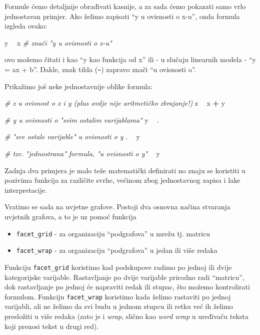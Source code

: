 \documentclass[]{book}
\newenvironment{Shaded}{\begin{snugshade}}{\end{snugshade}}
\newcommand{\StringTok}[1]{\textcolor[rgb]{0.31,0.60,0.02}{#1}}
\newcommand{\CommentTok}[1]{\textcolor[rgb]{0.56,0.35,0.01}{\textit{#1}}}
\newcommand{\OperatorTok}[1]{\textcolor[rgb]{0.81,0.36,0.00}{\textbf{#1}}}
\newcommand{\NormalTok}[1]{#1}
\providecommand{\tightlist}{%
  \setlength{\itemsep}{0pt}\setlength{\parskip}{0pt}}
\theoremstyle{definition}
\theoremstyle{definition}
\theoremstyle{definition}
\theoremstyle{remark}
\begin{document}
Formule ćemo detaljnije obrađivati kasnije, a za sada ćemo pokazati samo
vrlo jednostavan primjer. Ako želimo zapisati ``y u ovisnosti o x-u'',
onda formula izgleda ovako:

\begin{Shaded}
\begin{Highlighting}[]
\NormalTok{y }\OperatorTok{~}\StringTok{ }\NormalTok{x          }\CommentTok{# znači "y u ovisnosti o x-u"}
\end{Highlighting}
\end{Shaded}

ovo možemo čitati i kao ``y kao funkcija od x'' ili - u slučaju
linearnih modela - ``y = ax + b''. Dakle, znak tilda
(\texttt{\textasciitilde{}}) zapravo znači ``u ovisnosti o''.

Prikažimo još neke jednostavnije oblike formula:

\begin{Shaded}
\begin{Highlighting}[]
\CommentTok{# z u ovisnost o x i y (plus ovdje nije aritmetičko zbrajanje!)}
\NormalTok{z }\OperatorTok{~}\StringTok{ }\NormalTok{x }\OperatorTok{+}\StringTok{ }\NormalTok{y  }

\CommentTok{# y u ovisnosti o "svim ostalim varijablama"}
\NormalTok{y }\OperatorTok{~}\StringTok{ }\NormalTok{. }

\CommentTok{# "sve ostale varijable" u ovisnosti o y}
\NormalTok{. }\OperatorTok{~}\StringTok{ }\NormalTok{y   }

\CommentTok{# tzv. "jednostrana" formula, "u ovisnosti o y"}
\OperatorTok{~}\StringTok{ }\NormalTok{y        }
\end{Highlighting}
\end{Shaded}

Zadnja dva primjera je malo teže matematički definirati no znaju se
koristiti u pozivima funkcija za različite svrhe, većinom zbog
jednostavnog zapisa i lake interpretacije.

Vratimo se sada na uvjetne grafove. Postoji dva osnovna načina stvaranja
uvjetnih grafova, a to je uz pomoć funkcija

\begin{itemize}
\tightlist
\item
  \texttt{facet\_grid} - za organizaciju ``podgrafova'' u mrežu tj.
  matricu
\item
  \texttt{facet\_wrap} - za organizaciju ``podgrafova'' u jedan ili više
  redaka
\end{itemize}

Funkciju \texttt{facet\_grid} koristimo kad podskupove radimo po jednoj
ili dvije kategorijske varijable. Rastavljanje po dvije varijable
prirodno radi ``matricu'', dok rastavljanje po jednoj će napraviti redak
ili stupac, što možemo kontrolirati formulom. Funkciju
\texttt{facet\_wrap} koristimo kada želimo rastaviti po jednoj
varijabli, ali ne želimo da svi budu u jednom stupcu ili retku već ih
želimo presložiti u više redaka (zato je i \emph{wrap}, slično kao
\emph{word wrap} u uređivaču teksta koji prenosi tekst u drugi red).
\end{document}
